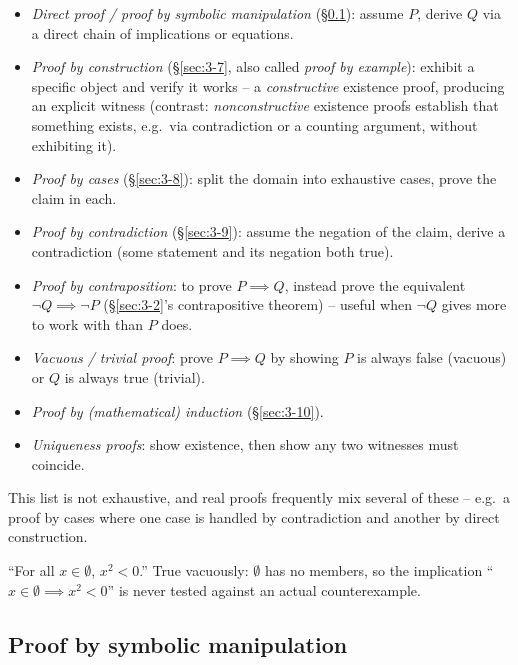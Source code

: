 \documentclass[11pt]{article}
\begin{document}
\begin{note}
\begin{itemize}
    \item \emph{Direct proof / proof by symbolic manipulation} (\S\ref{sec:3-6}): assume $P$, derive $Q$ via a direct chain of implications or equations.
    \item \emph{Proof by construction} (\S\ref{sec:3-7}, also called \emph{proof by example}): exhibit a specific object and verify it works -- a \emph{constructive} existence proof, producing an explicit witness (contrast: \emph{nonconstructive} existence proofs establish that something exists, e.g.\ via contradiction or a counting argument, without exhibiting it).
    \item \emph{Proof by cases} (\S\ref{sec:3-8}): split the domain into exhaustive cases, prove the claim in each.
    \item \emph{Proof by contradiction} (\S\ref{sec:3-9}): assume the negation of the claim, derive a contradiction (some statement and its negation both true).
    \item \emph{Proof by contraposition}: to prove $P \implies Q$, instead prove the equivalent $\neg Q \implies \neg P$ (\S\ref{sec:3-2}'s contrapositive theorem) -- useful when $\neg Q$ gives more to work with than $P$ does.
    \item \emph{Vacuous / trivial proof}: prove $P \implies Q$ by showing $P$ is always false (vacuous) or $Q$ is always true (trivial).
    \item \emph{Proof by (mathematical) induction} (\S\ref{sec:3-10}).
    \item \emph{Uniqueness proofs}: show existence, then show any two witnesses must coincide.
\end{itemize}
This list is not exhaustive, and real proofs frequently mix several of these -- e.g.\ a proof by cases where one case is handled by contradiction and another by direct construction.
\end{note}

\begin{example}
``For all $x\in\emptyset$, $x^2<0$.'' True vacuously: $\emptyset$ has no members, so the implication ``$x\in\emptyset \implies x^2<0$'' is never tested against an actual counterexample.
\end{example}

\subsection{Proof by symbolic manipulation}
\label{sec:3-6}
\end{document}
